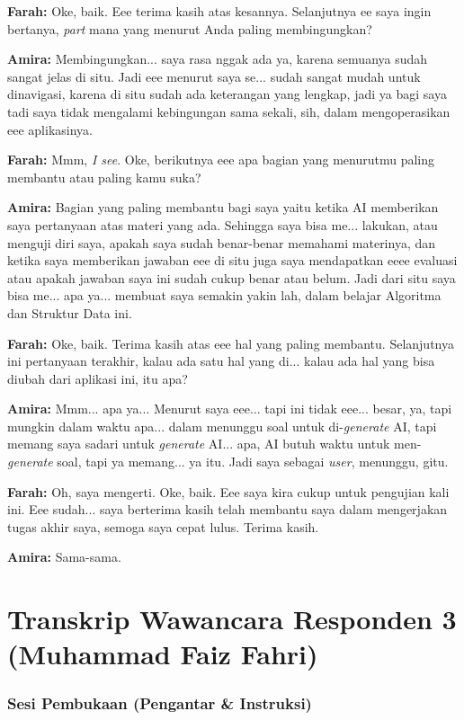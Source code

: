 \textbf{Farah:} Oke, baik. Eee terima kasih atas kesannya. Selanjutnya ee saya ingin bertanya, \textit{part} mana yang menurut Anda paling membingungkan?

\textbf{Amira:} Membingungkan... saya rasa nggak ada ya, karena semuanya sudah sangat jelas di situ. Jadi eee menurut saya se... sudah sangat mudah untuk dinavigasi, karena di situ sudah ada keterangan yang lengkap, jadi ya bagi saya tadi saya tidak mengalami kebingungan sama sekali, sih, dalam mengoperasikan eee aplikasinya.

\textbf{Farah:} Mmm, \textit{I see}. Oke, berikutnya eee apa bagian yang menurutmu paling membantu atau paling kamu suka?

\textbf{Amira:} Bagian yang paling membantu bagi saya yaitu ketika AI memberikan saya pertanyaan atas materi yang ada. Sehingga saya bisa me... lakukan, atau menguji diri saya, apakah saya sudah benar-benar memahami materinya, dan ketika saya memberikan jawaban eee di situ juga saya mendapatkan eeee evaluasi atau apakah jawaban saya ini sudah cukup benar atau belum. Jadi dari situ saya bisa me... apa ya... membuat saya semakin yakin lah, dalam belajar Algoritma dan Struktur Data ini.

\textbf{Farah:} Oke, baik. Terima kasih atas eee hal yang paling membantu. Selanjutnya ini pertanyaan terakhir, kalau ada satu hal yang di... kalau ada hal yang bisa diubah dari aplikasi ini, itu apa?

\textbf{Amira:} Mmm... apa ya... Menurut saya eee... tapi ini tidak eee... besar, ya, tapi mungkin dalam waktu apa... dalam menunggu soal untuk di-\textit{generate} AI, tapi memang saya sadari untuk \textit{generate} AI... apa, AI butuh waktu untuk men-\textit{generate} soal, tapi ya memang... ya itu. Jadi saya sebagai \textit{user}, menunggu, gitu.

\textbf{Farah:} Oh, saya mengerti. Oke, baik. Eee saya kira cukup untuk pengujian kali ini. Eee sudah... saya berterima kasih telah membantu saya dalam mengerjakan tugas akhir saya, semoga saya cepat lulus. Terima kasih.

\textbf{Amira:} Sama-sama.

\section{Transkrip Wawancara Responden 3 (Muhammad Faiz Fahri)}

\subsubsection*{Sesi Pembukaan (Pengantar \& Instruksi)}

